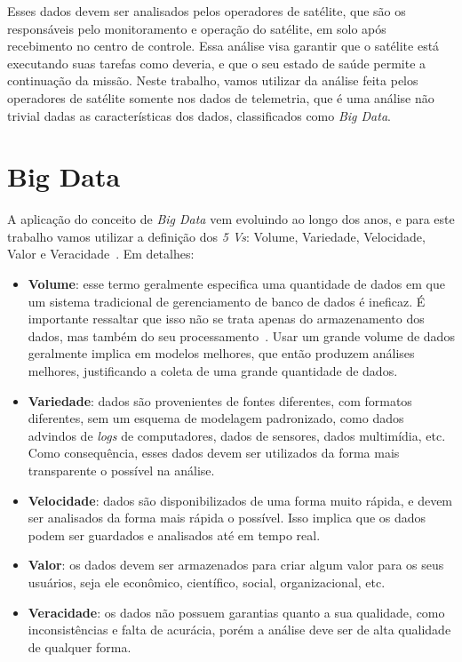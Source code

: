 Esses dados devem ser analisados pelos operadores de satélite, que são os responsáveis pelo monitoramento e operação do satélite, em solo após recebimento no centro de controle.
Essa análise visa garantir que o satélite está executando suas tarefas como deveria, e que o seu estado de saúde permite a continuação da missão.
{\color{cerulean}
Neste trabalho, vamos utilizar da análise feita pelos operadores de satélite somente nos dados de telemetria, que é uma análise não trivial dadas as características dos dados, classificados como \textit{Big Data}.
}

\section{Big Data}\label{ch:fun:bigdata}

A aplicação do conceito de \textit{Big Data} vem evoluindo ao longo dos anos, e para este trabalho vamos utilizar a definição dos \textit{5 Vs}: Volume, Variedade, Velocidade, Valor e Veracidade~\cite{kacfahemaniUnderstandableBigData2015}. Em detalhes:

\begin{itemize}
	\item \textbf{Volume}: esse termo geralmente especifica uma quantidade de dados em que um sistema tradicional de gerenciamento de banco de dados é ineficaz.
É importante ressaltar que isso não se trata apenas do armazenamento dos dados, mas também do seu processamento~\cite{boussoufBigDataBased2018}.
Usar um grande volume de dados geralmente implica em modelos melhores, que então produzem análises melhores, justificando a coleta de uma grande quantidade de dados.
	\item \textbf{Variedade}: dados são provenientes de fontes diferentes, com formatos diferentes, sem um esquema de modelagem padronizado, como dados advindos de \textit{logs} de computadores, dados de sensores, dados multimídia, etc.
Como consequência, esses dados devem ser utilizados da forma mais transparente o possível na análise.
	\item \textbf{Velocidade}: dados são disponibilizados de uma forma muito rápida, e devem ser analisados da forma mais rápida o possível.
Isso implica que os dados podem ser guardados e analisados até em tempo real.
	\item \textbf{Valor}: os dados devem ser armazenados para criar algum valor para os seus usuários, seja ele econômico, científico, social, organizacional, etc.
	\item \textbf{Veracidade}: os dados não possuem garantias quanto a sua qualidade, como inconsistências e falta de acurácia, porém a análise deve ser de alta qualidade de qualquer forma.
\end{itemize}

